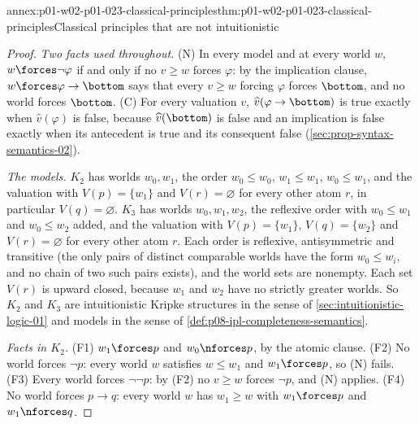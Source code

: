 \begin{annexitem}{annex:p01-w02-p01-023-classical-principles}{thm:p01-w02-p01-023-classical-principles}{Classical principles that are not intuitionistic}
\begin{proof}
\emph{Two facts used throughout.} (N) In every model and at every world
\(w\), \(w\forces\neg\varphi\) if and only if no \(v\geq w\) forces
\(\varphi\): by the implication clause, \(w\forces\varphi\to\bottom\) says
that every \(v\geq w\) forcing \(\varphi\) forces \(\bottom\), and no world
forces \(\bottom\). (C) For every valuation \(v\),
\(\widehat v(\varphi\to\bottom)\) is true exactly when
\(\widehat v(\varphi)\) is false, because \(\widehat v(\bottom)\) is false
and an implication is false exactly when its antecedent is true and its
consequent false (\cref{sec:prop-syntax-semantics-02}).

\emph{The models.} \(K_2\) has worlds \(w_0,w_1\), the order
\(w_0\leq w_0\), \(w_1\leq w_1\), \(w_0\leq w_1\), and the valuation with
\(V(p)=\{w_1\}\) and \(V(r)=\varnothing\) for every other atom \(r\), in
particular \(V(q)=\varnothing\). \(K_3\) has worlds \(w_0,w_1,w_2\), the
reflexive order with \(w_0\leq w_1\) and \(w_0\leq w_2\) added, and the
valuation with \(V(p)=\{w_1\}\), \(V(q)=\{w_2\}\) and
\(V(r)=\varnothing\) for every other atom \(r\). Each order is reflexive,
antisymmetric and transitive (the only pairs of distinct comparable worlds
have the form \(w_0\leq w_i\), and no chain of two such pairs exists), and
the world sets are nonempty. Each set \(V(r)\) is upward closed, because
\(w_1\) and \(w_2\) have no strictly greater worlds. So \(K_2\) and \(K_3\)
are intuitionistic Kripke structures in the sense of
\cref{sec:intuitionistic-logic-01} and models in the sense of
\cref{def:p08-ipl-completeness-semantics}.

\emph{Facts in \(K_2\).} (F1) \(w_1\forces p\) and \(w_0\nforces p\), by
the atomic clause. (F2) No world forces \(\neg p\): every world \(w\)
satisfies \(w\leq w_1\) and \(w_1\forces p\), so (N) fails. (F3) Every
world forces \(\neg\neg p\): by (F2) no \(v\geq w\) forces \(\neg p\), and
(N) applies. (F4) No world forces \(p\to q\): every world \(w\) has
\(w_1\geq w\) with \(w_1\forces p\) and \(w_1\nforces q\).


\end{proof}
\end{annexitem}
